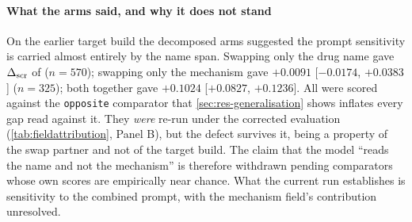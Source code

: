 \paragraph{What the arms said, and why it does not stand} On the earlier target
build the decomposed arms suggested the prompt sensitivity is carried almost
entirely by the name span. Swapping only the drug name gave $\Delta_{\textrm{scr}}$ of
 ($n = 570$); swapping only the mechanism gave
$+0.0091$ [$-0.0174$, $+0.0383$] ($n = 325$); both together gave $+0.1024$
[$+0.0827$, $+0.1236$]. All were scored against the \texttt{opposite}
comparator that \cref{sec:res-generalisation} shows inflates every gap read
against it. They \emph{were} re-run under the corrected evaluation
(\cref{tab:fieldattribution}, Panel B), but the defect survives it, being a
property of the swap partner and not of the target build. The claim that the
model ``reads the name and not the mechanism'' is therefore withdrawn pending
comparators whose own scores are empirically near chance. What the current run
establishes is sensitivity to the combined prompt, with the mechanism field's
contribution unresolved.

